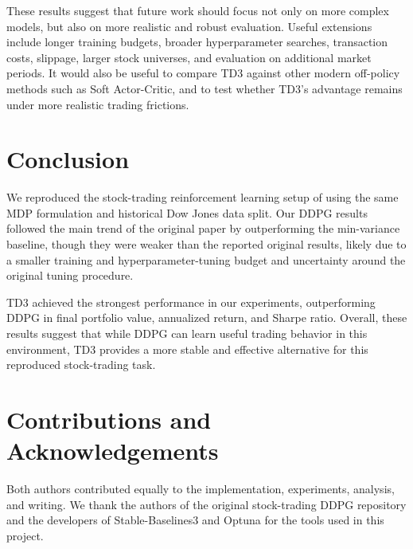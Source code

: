 \documentclass{article}
\begin{document}
These results suggest that future work should focus not only on more complex models, but also on more realistic and robust evaluation. Useful extensions include longer training budgets, broader hyperparameter searches, transaction costs, slippage, larger stock universes, and evaluation on additional market periods. It would also be useful to compare TD3 against other modern off-policy methods such as Soft Actor-Critic, and to test whether TD3's advantage remains under more realistic trading frictions.


\section{Conclusion}

We reproduced the stock-trading reinforcement learning setup of \cite{liu2018practical} using the same MDP formulation and historical Dow Jones data split. Our DDPG results followed the main trend of the original paper by outperforming the min-variance baseline, though they were weaker than the reported original results, likely due to a smaller training and hyperparameter-tuning budget and uncertainty around the original tuning procedure.

TD3 achieved the strongest performance in our experiments, outperforming DDPG in final portfolio value, annualized return, and Sharpe ratio. Overall, these results suggest that while DDPG can learn useful trading behavior in this environment, TD3 provides a more stable and effective alternative for this reproduced stock-trading task.

\section*{Contributions and Acknowledgements}
Both authors contributed equally to the implementation, experiments, analysis, and writing. We thank the authors of the original stock-trading DDPG repository and the developers of Stable-Baselines3 and Optuna for the tools used in this project.




\newpage
\appendix
\clearpage
\end{document}
